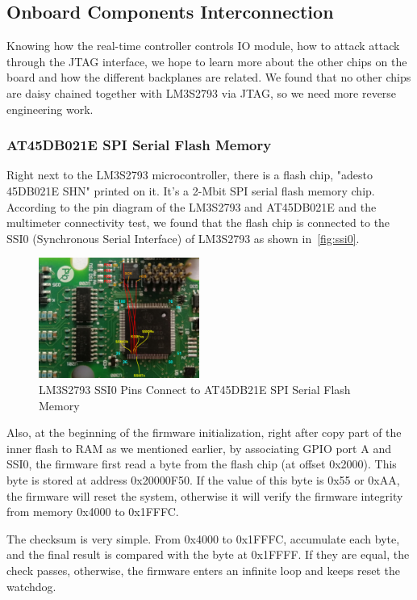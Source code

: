 \subsection{Onboard Components Interconnection}
Knowing how the real-time controller controls IO module, how to attack attack through the JTAG interface, we hope to learn more about the other chips on the board and how the different backplanes are related. We found that no other chips are daisy chained together with LM3S2793 via JTAG, so we need more reverse engineering work.

\subsubsection{AT45DB021E SPI Serial Flash Memory}
Right next to the LM3S2793 microcontroller, there is a flash chip, "adesto 45DB021E SHN" printed on it. It's a 2-Mbit SPI serial flash memory chip. According to the pin diagram of the LM3S2793 and AT45DB021E and the multimeter connectivity test, we found that the flash chip is connected to the SSI0 (Synchronous Serial Interface) of LM3S2793 as shown in~\autoref{fig:ssi0}.

\begin{figure}[th]
	\includegraphics[width=0.47\textwidth]{figures/ssi0}
	\centering
	\caption{LM3S2793 SSI0 Pins Connect to AT45DB21E SPI Serial Flash Memory}
	\label{fig:ssi0}
\end{figure}

Also, at the beginning of the firmware initialization, right after copy part of the inner flash to RAM as we mentioned earlier, by associating GPIO port A and SSI0, the firmware first read a byte from the flash chip (at offset 0x2000). This byte is stored at address 0x20000F50. If the value of this byte is 0x55 or 0xAA, the firmware will reset the system, otherwise it will verify the firmware integrity from memory 0x4000 to 0x1FFFC. 

The checksum is very simple. From 0x4000 to 0x1FFFC, accumulate each byte, and the final result is compared with the byte at 0x1FFFF. If they are equal, the check passes, otherwise, the firmware enters an infinite loop and keeps reset the watchdog.

